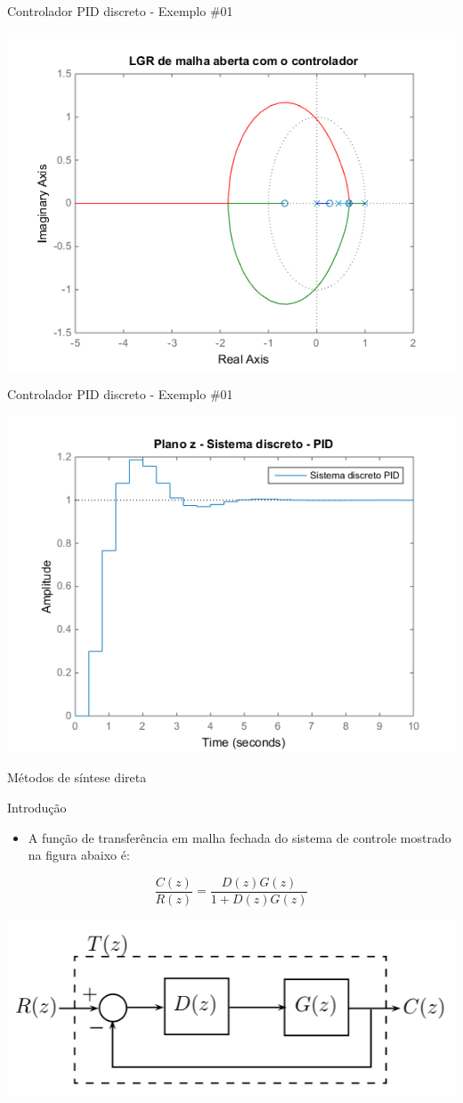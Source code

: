 \begin{frame}{Controlador PID discreto - Exemplo \#01}
\centerline{\includegraphics[width=0.8\linewidth]{Figuras/Ch12/fig2.png}}
\end{frame}

\begin{frame}{Controlador PID discreto - Exemplo \#01}
\centerline{\includegraphics[width=0.8\linewidth]{Figuras/Ch12/fig3.png}}
\end{frame}

\begin{frame}{Métodos de síntese direta}
\begin{block}{Introdução}
\begin{itemize}
    \item A função de transferência em malha fechada  do sistema de controle mostrado na figura abaixo é: 
\end{itemize}
$$\dfrac{C(z)}{R(z)} = \dfrac{D(z)G(z)}{1+D(z)G(z)}$$
\end{block}
\centerline{\includegraphics[width=0.8\linewidth]{Figuras/Ch12/fig4.PNG}}
\end{frame}

